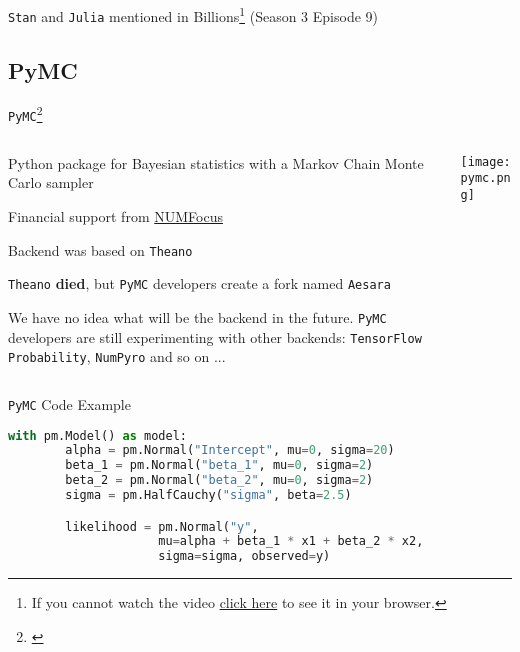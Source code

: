 \begin{frame}{\texttt{Stan} and \texttt{Julia} mentioned in Billions\footnote{
			If you cannot watch the video \href{https://github.com/storopoli/Bayesian-Statistics/blob/main/slides/images/stan_billions_subtitled.mp4?raw=true}{click here}
			to see it in your browser.} (Season 3 Episode 9)}
	\centering
\end{frame}

\subsection{PyMC}
\begin{frame}{\texttt{PyMC}\footnote{\textcite{pymc3}}}
	\begin{columns}
		\begin{column}{0.8\textwidth}
			\begin{vfilleditems}
				\small
				\item Python package for Bayesian statistics
				with a Markov Chain Monte Carlo sampler
				\item Financial support from \href{https://numfocus.org/}{NUMFocus}
				\item Backend was based on \texttt{Theano}
				\item \texttt{Theano} \textbf{died}, but \texttt{PyMC} developers create a fork
				named \texttt{Aesara}
				\item We have no idea what will be the backend in
				the future.
				\texttt{PyMC} developers are still experimenting with other
				backends: \texttt{TensorFlow Probability}, \texttt{NumPyro}
				and so on ...
			\end{vfilleditems}
		\end{column}
		\begin{column}{0.2\textwidth}
			\centering
			\texttt{[image: pymc.png]}
		\end{column}
	\end{columns}
\end{frame}

\begin{frame}[fragile]{\texttt{PyMC} Code Example}
	\begin{lstlisting}[basicstyle=\small, language=Python]
    with pm.Model() as model:
        alpha = pm.Normal("Intercept", mu=0, sigma=20)
        beta_1 = pm.Normal("beta_1", mu=0, sigma=2)
        beta_2 = pm.Normal("beta_2", mu=0, sigma=2)
        sigma = pm.HalfCauchy("sigma", beta=2.5)

        likelihood = pm.Normal("y",
                     mu=alpha + beta_1 * x1 + beta_2 * x2,
                     sigma=sigma, observed=y)
\end{lstlisting}
\end{frame}

